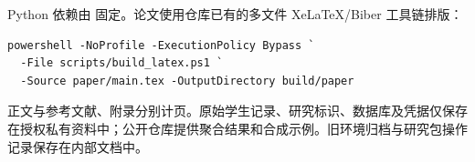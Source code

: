 Python 依赖由  固定。论文使用仓库已有的多文件 XeLaTeX/Biber 工具链排版：
\begingroup\small
\begin{verbatim}
powershell -NoProfile -ExecutionPolicy Bypass `
  -File scripts/build_latex.ps1 `
  -Source paper/main.tex -OutputDirectory build/paper
\end{verbatim}
\endgroup
正文与参考文献、附录分别计页。原始学生记录、研究标识、数据库及凭据仅保存在授权私有资料中；公开仓库提供聚合结果和合成示例。旧环境归档与研究包操作记录保存在内部文档中。
